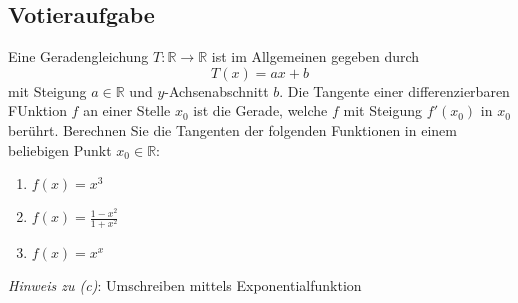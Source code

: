 \documentclass[a4paper]{article}
\begin{document}
\setcounter{section}{8}
\subsection{Votieraufgabe}
Eine Geradengleichung $T: \mathbb{R} \rightarrow \mathbb{R}$ ist im Allgemeinen gegeben durch
\[
T(x) = ax + b
\]
mit Steigung $a \in \mathbb{R}$ und $y$-Achsenabschnitt $b$. Die Tangente einer differenzierbaren FUnktion $f$ an einer Stelle $x_0$ ist die Gerade, welche $f$ mit Steigung $f'(x_0)$ in $x_0$ berührt. Berechnen Sie die Tangenten der folgenden Funktionen in einem beliebigen Punkt $x_0 \in \mathbb{R}$:
\begin{enumerate}[label=(\alph*)]
    \item $f(x) = x^3$
    \item $f(x) = \frac{1 - x^2}{1 + x^2}$
    \item $f(x) = x^x$
\end{enumerate}
\textit{Hinweis zu (c)}: Umschreiben mittels Exponentialfunktion
\end{document}
